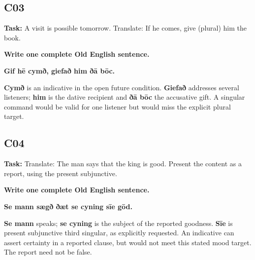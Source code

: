 \par\begin{minipage}{\linewidth}\raggedright
\subsection*{C03}

\textbf{Task:} A visit is possible tomorrow. Translate: If he comes, give (plural) him the book.

\textbf{Write one complete Old English sentence.}

\textbf{Gif hē cymð, giefað him ðā bōc.}

\textbf{Cymð} is an indicative in the open future condition. \textbf{Giefað} addresses several listeners; \textbf{him} is the dative recipient and \textbf{ðā bōc} the accusative gift. A singular command would be valid for one listener but would miss the explicit plural target.
\end{minipage}\par


\subsection*{C04}

\textbf{Task:} Translate: The man says that the king is good. Present the content as a report, using the present subjunctive.

\textbf{Write one complete Old English sentence.}

\textbf{Se mann sægð ðæt se cyning sīe gōd.}

\textbf{Se mann} speaks; \textbf{se cyning} is the subject of the reported goodness. \textbf{Sīe} is present subjunctive third singular, as explicitly requested. An indicative can assert certainty in a reported clause, but would not meet this stated mood target. The report need not be false.


